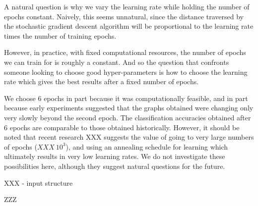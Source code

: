 \documentclass[10pt]{article}
\begin{document}
A natural question is why we vary the learning rate while holding the
number of epochs constant.  Naively, this seems unnatural, since the
distance traversed by the stochastic gradient descent algorithm will
be proportional to the learning rate times the number of training
epochs.

However, in practice, with fixed computational resources, the number
of epochs we can train for is roughly a constant.  And so the question
that confronts someone looking to choose good hyper-parameters is how
to choose the learning rate which gives the best results after a fixed
number of epochs.

We choose 6 epochs in part because it was computationally feasible,
and in part because early experiments suggested that the graphs
obtained were changing only very slowly beyond the second epoch.  The
classification accuracies obtained after 6 epochs are comparable to
those obtained historically.  However, it should be noted that recent
research XXX suggests the value of going to very large numbers of
epochs ($XXX ~ 10^3$), and using an annealing schedule for learning
which ultimately results in very low learning rates.  We do not
investigate these possibilities here, although they suggest natural
questions for the future.

XXX - input structure

ZZZ

%

% 
\end{document}
